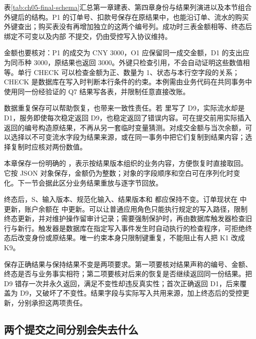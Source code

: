 表\ref{tab:ch05-final-schema}汇总第一章建表、第四章身份与结果列演进以及本节组合外键后的结构。P1 的订单号、扣款号保存在原结果中，也能沿订单、流水的购买外键查出；购买表没有再增加独立的这两个编号列。成功时三表金额相等、终态后绑定不可变以及内部  不提交，仍由受控写入协议维持。



金额也要核对：P1 的成交为 CNY 3000，O1 应保留同一成交金额，D1 的支出应为同币种 3000，原结果也返回 3000。外键只检查引用，不会自动证明这些数值相等。单行 CHECK 可以检查金额为正、数量为 1、状态与本行空字段的关系；CHECK 是数据库在写入时判断本行条件的约束。本例需由业务代码在共同事务中使用同一份经验证的 Q7 结果写各表，并限制任意直接改账。

数据重复保存可以帮助恢复，也带来一致性责任。若  里写了 D9，实际流水却是 D1，服务即使每次稳定返回 D9，也稳定返回了错误内容。可在提交前用实际插入返回的编号构造原结果，不再从另一套临时变量猜测。对成交金额与当次余额，可以选择以不可变流水字段为结果来源，或在同一事务中把它们复制到结果内容；选择复制时应核对两份数值。



本章保存一份明确的 ，表示按结果版本组织的业务内容，方便恢复时直接取回。它按 JSON 对象保存，金额仍为整数；对象的字段顺序和空白可在序列化时变化。下一节会据此区分业务结果重放与逐字节回放。

终态后，S、输入版本、规范化输入、结果版本和  都应保持不变。订单现状在  中更新，账户余额在  中更新。可以让普通应用角色只能执行规定的写入路径，限制终态更新，并对维护操作留审计记录；需要强制保护时，再由数据库触发器检查旧行与新行。触发器是数据库在指定写入事件发生时自动执行的检查程序，可拒绝终态后改变身份或原结果。唯一约束本身只限制键重复，不能阻止有人把 K1 改成 K9。

保存正确结果与保持结果不变是两项要求。第一项要核对结果声称的编号、金额、终态是否与业务事实相符；第二项要核对后来的恢复是否继续返回同一份结果。把 D9 错存一次并永久返回，满足不变性却违反真实性；首次正确返回 D1，后来覆盖为 D9，又破坏了不变性。结果字段与实际写入共用来源，加上终态后的受控更新，分别承担这两项责任。



\subsection*{两个提交之间分别会失去什么}

